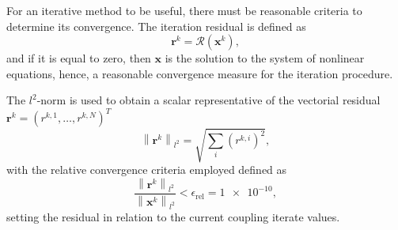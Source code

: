          For an iterative method to be useful, there must be reasonable criteria to determine its convergence.
          The iteration residual is defined as
          \begin{equation}
            \mathbf{r}^{k} = \bm{\mathcal{R}}(\mathbf{x}^{k}),
          \end{equation}
          and if it is equal to zero, then $\mathbf{x}$ is the solution to the system of nonlinear equations, hence, a reasonable convergence measure for the iteration procedure.

          The $l^{2}$-norm is used to obtain a scalar representative of the vectorial residual \(\mathbf{r}^{k}=\left(r^{k,1}, \ldots, r^{k,N}\right)^{T}\)
          \begin{equation}
            \left\|\mathbf{r} ^{k}\right\|_{l^{2}}=\sqrt{\sum_{i}\left(r^{k, i}\right)^{2}},
          \end{equation}
          with the relative convergence criteria employed defined as
          \begin{equation} \label{eq:def_res_used}
            \frac{\left\|\mathbf{r}^{k}\right\|_{l^{2}}}{\left\|\mathbf{x}^{k}\right\|_{l^{2}}}<\epsilon_\mathrm{rel} = \num{1e-10},
          \end{equation}
          setting the residual in relation to the current coupling iterate values.
